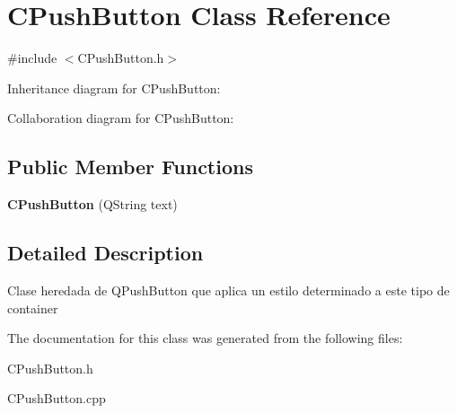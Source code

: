 \hypertarget{classCPushButton}{}\section{C\+Push\+Button Class Reference}
\label{classCPushButton}


{\ttfamily \#include $<$C\+Push\+Button.\+h$>$}



Inheritance diagram for C\+Push\+Button\+:


Collaboration diagram for C\+Push\+Button\+:
\subsection*{Public Member Functions}
\begin{DoxyCompactItemize}
\item 
{\bfseries C\+Push\+Button} (Q\+String text)\hypertarget{classCPushButton_a57826ce36e788184e955d492c93425c9}{}\label{classCPushButton_a57826ce36e788184e955d492c93425c9}

\end{DoxyCompactItemize}


\subsection{Detailed Description}
Clase heredada de \textquotesingle{}Q\+Push\+Button\textquotesingle{} que aplica un estilo determinado a este tipo de container 

The documentation for this class was generated from the following files\+:\begin{DoxyCompactItemize}
\item 
C\+Push\+Button.\+h\item 
C\+Push\+Button.\+cpp\end{DoxyCompactItemize}
